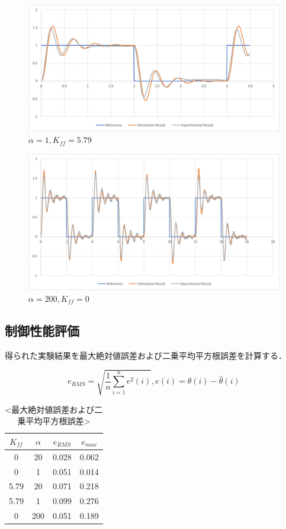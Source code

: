 \documentclass[xelatex,ja=standard,jafont=noto]{bxjsarticle}
\numberwithin{figure}{section}
\begin{document}
\newpage

\begin{figure}[h!]
    \centering
    \includegraphics[scale=0.6]{023.png}
    \caption{$\alpha=1,K_{ff}=5.79$}
\end{figure}

\begin{figure}[h!]
    \centering
    \includegraphics[scale=0.6]{024.png}
    \caption{$\alpha=200,K_{ff}=0$}
\end{figure}

\newpage

\subsection{制御性能評価}

得られた実験結果を最大絶対値誤差および二乗平均平方根誤差を計算する．

\begin{equation}
    e_{RMS}=\sqrt{\frac{1}{n}\sum_{i=1}^{n}e^{2}(i)},e(i)=\theta(i)-\hat{\theta}(i)
\end{equation}


\begin{table}[!htbp]
\centering
\caption{<最大絶対値誤差および二乗平均平方根誤差>}
\begin{tabular}{cccc}
\hline
 $ K_{ff}$ & $\alpha$ & $e_{RMS}$ & $e_{max}$\\
\hline
0& 20  & 0.028& 0.062\\
0& 1  & 0.051& 0.014\\
5.79 & 20 & 0.071& 0.218\\
5.79& 1 & 0.099&0.276\\
0 & 200 & 0.051 &0.189\\
\hline
\end{tabular}
\end{table}
\end{document}
